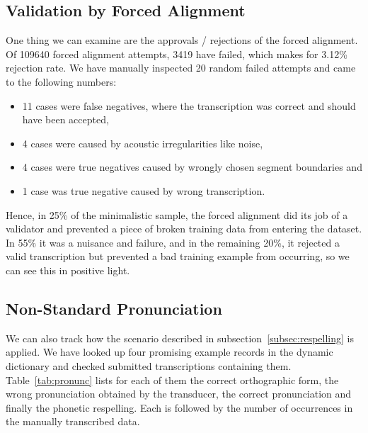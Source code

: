 \documentclass{itatnew}
\begin{document}
\subsection{Validation by Forced Alignment}

One thing we can examine are the approvals / rejections of the forced alignment.
Of 109640 forced alignment attempts, 3419 have failed, which makes for 3.12\%
rejection rate.  We have manually inspected 20 random failed attempts and came
to the following numbers:
\begin{itemize}
\item{
    11 cases were false negatives, where the transcription was correct and
    should have been accepted,
}
\item{
    4 cases were caused by acoustic irregularities like noise,
}
\item{
    4 cases were true negatives caused by wrongly chosen segment boundaries and
}
\item{
    1 case was true negative caused by wrong transcription.
}
\end{itemize}

Hence, in 25\% of the minimalistic sample, the forced alignment did its job of a
validator and prevented a piece of broken training data from entering the
dataset. In 55\% it was a nuisance and failure, and in the remaining 20\%, it
rejected a valid transcription but prevented a bad training example from
occurring, so we can see this in positive light.

\subsection{Non-Standard Pronunciation}

We can also track how the scenario described in
subsection~\ref{subsec:respelling} is applied. We have looked up four promising
example records in the dynamic dictionary and checked submitted transcriptions
containing them. Table~\ref{tab:pronunc} lists for each of them the correct
orthographic form, the wrong pronunciation obtained by the transducer, the
correct pronunciation and finally the phonetic respelling. Each is followed by
the number of occurrences in the manually transcribed data.
\end{document}
